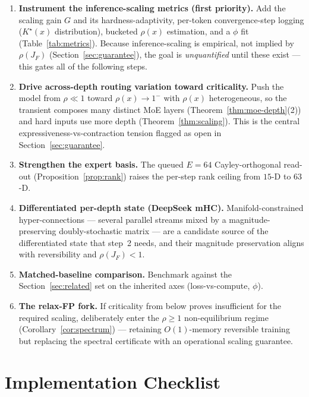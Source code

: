\documentclass[11pt]{article}
\newcommand{\rhoF}{\rho(J_F)}
\begin{document}
\begin{enumerate}[leftmargin=1.6em,itemsep=2pt]
  \item \textbf{Instrument the inference-scaling metrics (first priority).} Add the scaling gain
    $G$ and its hardness-adaptivity, per-token convergence-step logging ($K^\star(x)$ distribution),
    bucketed $\rho(x)$ estimation, and a $\phi$ fit (Table~\ref{tab:metrics}).  Because
    inference-scaling is empirical, not implied by $\rhoF$ (Section~\ref{sec:guarantee}), the goal
    is \emph{unquantified} until these exist --- this gates all of the following steps.
  \item \textbf{Drive across-depth routing variation toward criticality.} Push the model from
    $\rho\ll1$ toward $\rho(x)\to1^-$ with $\rho(x)$ heterogeneous, so the transient composes many
    distinct MoE layers (Theorem~\ref{thm:moe-depth}(2)) and hard inputs use more depth
    (Theorem~\ref{thm:scaling}).  This is the central expressiveness-vs-contraction tension flagged
    as open in Section~\ref{sec:guarantee}.
  \item \textbf{Strengthen the expert basis.} The queued $E{=}64$ Cayley-orthogonal read-out
    (Proposition~\ref{prop:rank}) raises the per-step rank ceiling from $15$-D to $63$-D.
  \item \textbf{Differentiated per-depth state (DeepSeek mHC).} Manifold-constrained hyper-connections
    --- several parallel streams mixed by a magnitude-preserving doubly-stochastic matrix --- are a
    candidate source of the differentiated state that step~2 needs, and their magnitude preservation
    aligns with reversibility and $\rhoF<1$.
  \item \textbf{Matched-baseline comparison.} Benchmark against the Section~\ref{sec:related} set on
    the inherited axes (loss-vs-compute, $\phi$).
  \item \textbf{The relax-FP fork.} If criticality from below proves insufficient for the required
    scaling, deliberately enter the $\rho\ge1$ non-equilibrium regime (Corollary~\ref{cor:spectrum})
    --- retaining $O(1)$-memory reversible training but replacing the spectral certificate with an
    operational scaling guarantee.
\end{enumerate}

\appendix

\section{Implementation Checklist}
\label{app:checklist}
\end{document}

